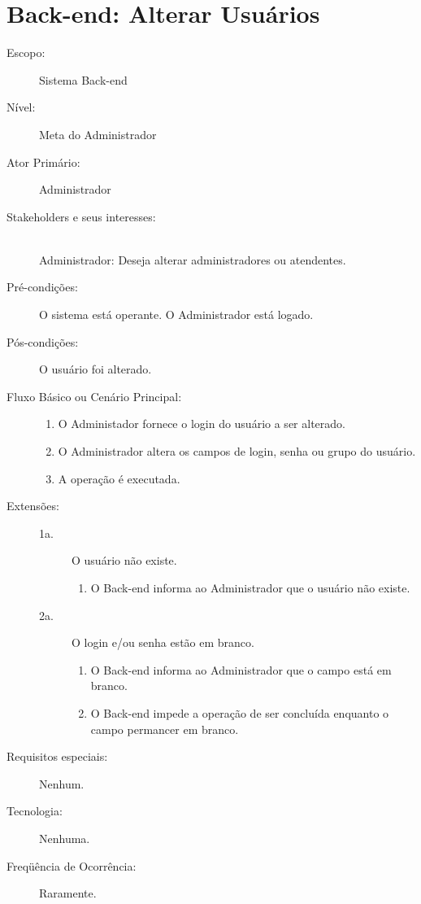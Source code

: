 \documentclass[brazil,times]{abnt}
\begin{document}
\section{Back-end: Alterar Usuários}
\begin{description}
\item[Escopo:] Sistema Back-end
\item[Nível:] Meta do Administrador
\item[Ator Primário:] Administrador
\item[Stakeholders e seus interesses:] \hfill \\
Administrador: Deseja alterar administradores ou atendentes.

\item[Pré-condições:] O sistema está operante. O Administrador está logado.
\item[Pós-condições:] O usuário foi alterado.
\item[Fluxo Básico ou Cenário Principal:]\hfill
\begin{enumerate}
  \item O Administador fornece o login do usuário a ser alterado.
  \item O Administrador altera os campos de login, senha ou grupo do
  usuário.
  \item A operação é executada.
\end{enumerate}

\item[Extensões:]\hfill
\begin{description}
	\item[1a.] O usuário não existe.
	\begin{enumerate}
 		\item O Back-end informa ao Administrador que o usuário não existe.
	\end{enumerate}
	\item[2a.] O login e/ou senha estão em branco.
	\begin{enumerate}
 		\item O Back-end informa ao Administrador que o campo está em branco.
 		\item O Back-end impede a operação de ser concluída enquanto o campo
 		permancer em branco.
	\end{enumerate}	

\end{description}
\item[Requisitos especiais:] Nenhum.
\item[Tecnologia:] Nenhuma.
\item[Freqüência de Ocorrência:] Raramente.

\end{description}
\end{document}
